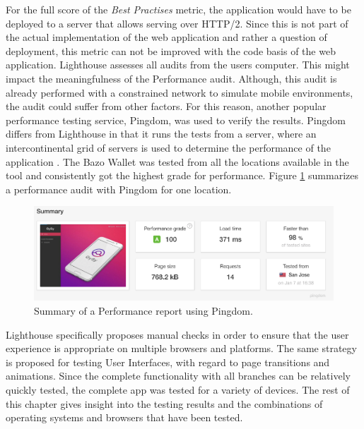 For the full score of the \textit{Best Practises} metric, the application would have to be deployed to a server that allows serving over HTTP/2. Since this is not part of the actual implementation of the web application and rather a question of deployment, this metric can not be improved with the code basis of the web application.
Lighthouse assesses all audits from the users computer. This might impact the meaningfulness of the Performance audit. Although, this audit is already performed with a constrained network to simulate mobile environments, the audit could suffer from other factors. For this reason, another popular performance testing service, Pingdom, was used to verify the results. Pingdom differs from Lighthouse in that it runs the tests from a server, where an intercontinental grid of servers is used to determine the performance of the application \cite{pingdom}. The Bazo Wallet was tested from all the locations available in the tool and consistently got the highest grade for performance. Figure \ref{fig:pingdom} summarizes a performance audit with Pingdom for one location.
\begin{figure}
\centering
\includegraphics[width=1\textwidth]{screenshots/pingdom.png}
\caption{\label{fig:pingdom}Summary of a Performance report using Pingdom.}
\end{figure}

Lighthouse specifically proposes manual checks in order to ensure that the user experience is appropriate on multiple browsers and platforms. The same strategy is proposed for testing User Interfaces, with regard to page transitions and animations. 
Since the complete functionality with all branches can be relatively quickly tested, the complete app was tested for a variety of devices. The rest of this chapter gives insight into the testing results and the combinations of operating systems and browsers that have been tested.


